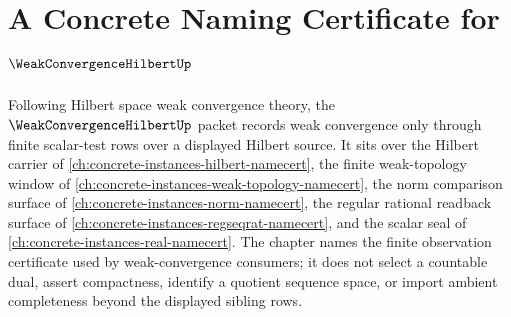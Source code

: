 \chapter{A Concrete Naming Certificate for $\WeakConvergenceHilbertUp$}
\label{ch:concrete-instances-weak-convergence-hilbert-namecert}

Following Hilbert space weak convergence theory, the $\WeakConvergenceHilbertUp$ packet records weak convergence only through finite scalar-test rows over a displayed Hilbert source. It sits over the Hilbert carrier of \autoref{ch:concrete-instances-hilbert-namecert}, the finite weak-topology window of \autoref{ch:concrete-instances-weak-topology-namecert}, the norm comparison surface of \autoref{ch:concrete-instances-norm-namecert}, the regular rational readback surface of \autoref{ch:concrete-instances-regseqrat-namecert}, and the scalar seal of \autoref{ch:concrete-instances-real-namecert}. The chapter names the finite observation certificate used by weak-convergence consumers; it does not select a countable dual, assert compactness, identify a quotient sequence space, or import ambient completeness beyond the displayed sibling rows.

